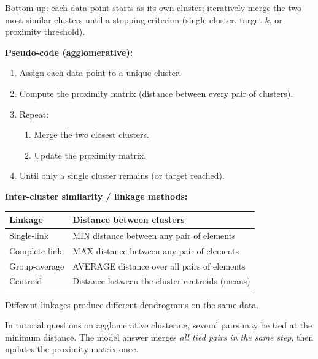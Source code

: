 \begin{defbox}
Bottom-up: each data point starts as its own cluster; iteratively merge the two most similar clusters until a stopping criterion (single cluster, target $k$, or proximity threshold).
\end{defbox}

\textbf{Pseudo-code (agglomerative):}
\begin{enumerate}
  \item Assign each data point to a unique cluster.
  \item Compute the proximity matrix (distance between every pair of clusters).
  \item Repeat:
  \begin{enumerate}
    \item Merge the two closest clusters.
    \item Update the proximity matrix.
  \end{enumerate}
  \item Until only a single cluster remains (or target reached).
\end{enumerate}

\textbf{Inter-cluster similarity / linkage methods:}

\begin{center}
\renewcommand{\arraystretch}{1.3}
\begin{tabular}{@{} l p{8.5cm} @{}}
\toprule
\textbf{Linkage} & \textbf{Distance between clusters} \\
\midrule
Single-link & MIN distance between any pair of elements \\
Complete-link & MAX distance between any pair of elements \\
Group-average & AVERAGE distance over all pairs of elements \\
Centroid & Distance between the cluster centroids (means) \\
\bottomrule
\end{tabular}
\end{center}

Different linkages produce different dendrograms on the same data.

\begin{tipbox}
In tutorial questions on agglomerative clustering, several pairs may be tied at the minimum distance. The model answer merges \emph{all tied pairs in the same step}, then updates the proximity matrix once.
\end{tipbox}

